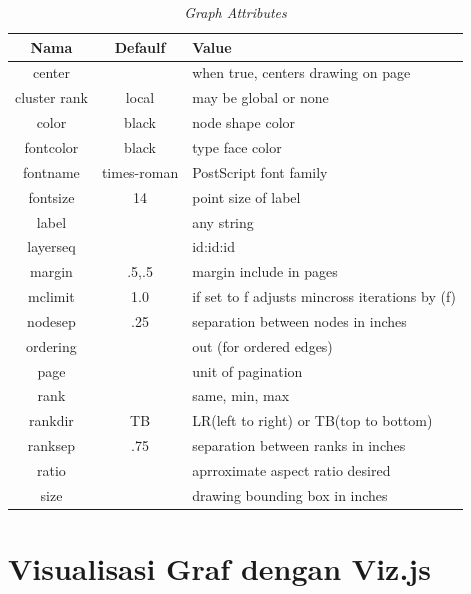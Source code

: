 \begin{enumerate}
\begin{enumerate}
\begin{table}[htbp]
\begin{center}
\caption{\textit{Graph Attributes}}
\begin{tabular}{|c|c|l|}
\hline
  Nama & Defaulf & Value \\
\hline
  center & & when true, centers drawing on page \\
  cluster rank & local & may be global or none \\
  color & black & node shape color \\
  fontcolor & black & type face color \\
  fontname & times-roman & PostScript font family \\
  fontsize & 14 & point size of label \\
  label & & any string \\
  layerseq & & id:id:id \\
  margin & .5,.5 & margin include in pages \\
  mclimit & 1.0 & if set to f adjusts mincross iterations by (f) \\
  nodesep & .25 & separation between nodes in inches \\
  ordering & & out (for ordered edges) \\
  page & & unit of pagination  \\
  rank & & same, min, max \\
  rankdir & TB & LR(left to right) or TB(top to bottom) \\
  ranksep & .75 & separation between ranks in inches \\
  ratio & & aprroximate aspect ratio desired \\
  size & & drawing bounding box in inches \\
\hline
\end{tabular}
\end{center}
\end{table}

\end{enumerate}
\end{enumerate}



\section{Visualisasi Graf dengan Viz.js}
\label{sec: Visualisasi Graf dengan Viz.js}

